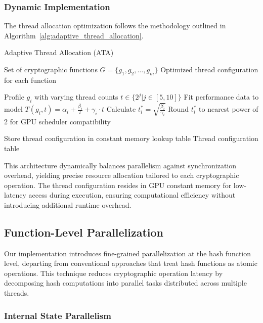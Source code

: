 \documentclass[journal]{IEEEtran}
\begin{document}
\subsubsection{Dynamic Implementation}

The thread allocation optimization follows the methodology outlined in Algorithm~\ref{alg:adaptive_thread_allocation}.

\begin{algorithm}
  \caption{Adaptive Thread Allocation (ATA)}
  \label{alg:adaptive_thread_allocation}
  \begin{algorithmic}[1]
    \REQUIRE Set of cryptographic functions $G = \{g_1, g_2, \ldots, g_m\}$
    \ENSURE Optimized thread configuration for each function

    \STATE Profile $g_i$ with varying thread counts $t \in \{2^j | j \in [5, 10]\}$
    \STATE Fit performance data to model $T(g_i, t) = \alpha_i + \frac{\beta_i}{t} + \gamma_i \cdot t$
    \STATE Calculate $t_i^* = \sqrt{\frac{\beta_i}{\gamma_i}}$
    \STATE Round $t_i^*$ to nearest power of 2 for GPU scheduler compatibility
    \ENDFOR

    \STATE Store thread configuration in constant memory lookup table
    \RETURN Thread configuration table
  \end{algorithmic}
\end{algorithm}

This architecture dynamically balances parallelism against synchronization overhead, yielding precise resource allocation tailored to each cryptographic operation. The thread configuration resides in GPU constant memory for low-latency access during execution, ensuring computational efficiency without introducing additional runtime overhead.

\subsection{Function-Level Parallelization}

Our implementation introduces fine-grained parallelization at the hash function level, departing from conventional approaches that treat hash functions as atomic operations. This technique reduces cryptographic operation latency by decomposing hash computations into parallel tasks distributed across multiple threads.

\subsubsection{Internal State Parallelism}
\end{document}
